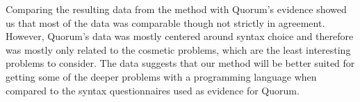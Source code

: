 Comparing the resulting data from the method with Quorum’s evidence showed us that most of the data was comparable though not strictly in agreement.
However, Quorum’s data was mostly centered around syntax choice and therefore was mostly only related to the cosmetic problems, which are the least interesting problems to consider.
The data suggests that our method will be better suited for getting some of the deeper problems with a programming language when compared to the syntax questionnaires used as evidence for Quorum.


